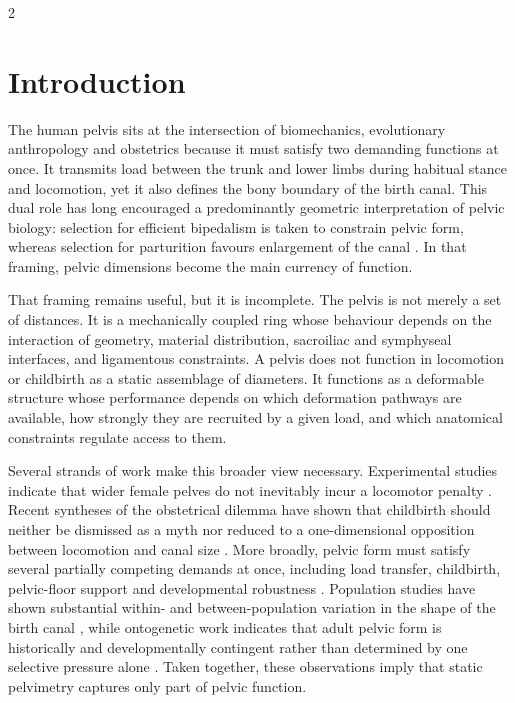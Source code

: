 \documentclass[openacc]{rsproca_new}
\begin{document}
\begin{multicols}{2}

\section{Introduction}

The human pelvis sits at the intersection of biomechanics, evolutionary anthropology and obstetrics because it must satisfy two demanding functions at once. It transmits load between the trunk and lower limbs during habitual stance and locomotion, yet it also defines the bony boundary of the birth canal. This dual role has long encouraged a predominantly geometric interpretation of pelvic biology: selection for efficient bipedalism is taken to constrain pelvic form, whereas selection for parturition favours enlargement of the canal \cite{RosenbergTrevathan2002,Trevathan2015,Grunstra2023}. In that framing, pelvic dimensions become the main currency of function.

That framing remains useful, but it is incomplete. The pelvis is not merely a set of distances. It is a mechanically coupled ring whose behaviour depends on the interaction of geometry, material distribution, sacroiliac and symphyseal interfaces, and ligamentous constraints. A pelvis does not function in locomotion or childbirth as a static assemblage of diameters. It functions as a deformable structure whose performance depends on which deformation pathways are available, how strongly they are recruited by a given load, and which anatomical constraints regulate access to them.

Several strands of work make this broader view necessary. Experimental studies indicate that wider female pelves do not inevitably incur a locomotor penalty \cite{Warrener2015}. Recent syntheses of the obstetrical dilemma have shown that childbirth should neither be dismissed as a myth nor reduced to a one-dimensional opposition between locomotion and canal size \cite{Pavlicev2020,Haeusler2021,Grunstra2023}. More broadly, pelvic form must satisfy several partially competing demands at once, including load transfer, childbirth, pelvic-floor support and developmental robustness \cite{Pavlicev2020,Haeusler2021,Grunstra2019,Grunstra2023}. Population studies have shown substantial within- and between-population variation in the shape of the birth canal \cite{BettiManica2018,Auerbach2018}, while ontogenetic work indicates that adult pelvic form is historically and developmentally contingent rather than determined by one selective pressure alone \cite{VerbruggenNowlan2017,Novak2020,KurkiDecrausaz2015}. Taken together, these observations imply that static pelvimetry captures only part of pelvic function.


\end{multicols}
\end{document}
